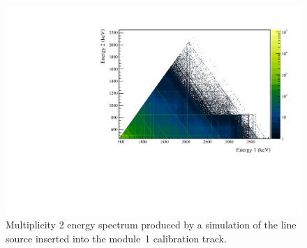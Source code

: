 \documentclass[/main.tex]{subfiles}
\begin{document}
\begin{figure}
  \centering
  \includegraphics[width=.8\linewidth]{Co56Sim2D}
  \caption[Simulation of multiplicty 2 events from  line source]{
    Multiplicity 2 energy spectrum produced by a simulation of the  line source inserted into the module~1 calibration track.
  }
\end{figure}
\end{document}
